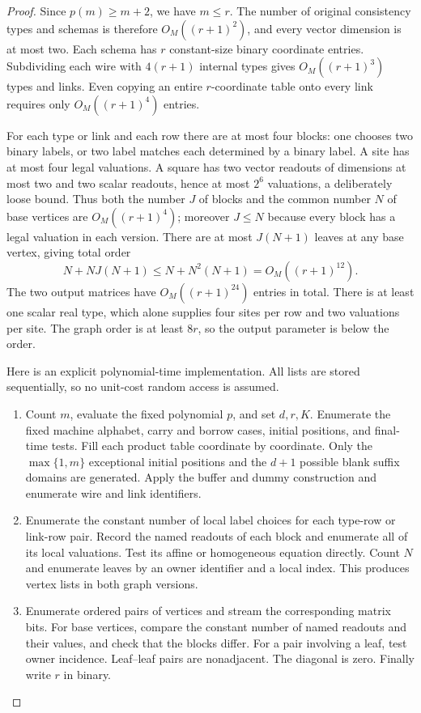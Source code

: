 \documentclass[11pt]{article}
\theoremstyle{definition}
\begin{document}
\begin{proof}
Since $p(m)\ge m+2$, we have $m\le r$. The number of original consistency
types and schemas is therefore $O_M((r+1)^2)$, and every vector dimension is
at most two. Each schema has $r$ constant-size binary coordinate entries.
Subdividing each wire with $4(r+1)$ internal types gives
$O_M((r+1)^3)$ types and links. Even copying an entire $r$-coordinate table
onto every link requires only $O_M((r+1)^4)$ entries.

For each type or link and each row there are at most four blocks: one chooses
two binary labels, or two label matches each determined by a binary label.
A site has at most four legal valuations. A square has two vector readouts
of dimensions at most two and two scalar readouts, hence at most $2^6$
valuations, a deliberately loose bound. Thus both the number $J$ of blocks
and the common number $N$ of base vertices are $O_M((r+1)^4)$; moreover
$J\le N$ because every block has a legal valuation in each version.
There are at most $J(N+1)$ leaves at any base vertex, giving total order
\begin{equation}\label{eq:graph-order-bound}
 N+NJ(N+1)\le N+N^2(N+1)=O_M((r+1)^{12}).
\end{equation}
The two output matrices have $O_M((r+1)^{24})$ entries in total.
There is at least one scalar real type, which alone supplies four sites per
row and two valuations per site. The graph order is at least $8r$, so the
output parameter is below the order.

Here is an explicit polynomial-time implementation. All lists are stored
sequentially, so no unit-cost random access is assumed.
\begin{enumerate}[label=\arabic*.,leftmargin=*]
\item Count $m$, evaluate the fixed polynomial $p$, and set $d,r,K$.
Enumerate the fixed machine alphabet, carry and borrow cases, initial
positions, and final-time tests. Fill each product table coordinate by
coordinate. Only the $\max\{1,m\}$ exceptional initial positions and the
$d+1$ possible blank suffix domains are generated. Apply the buffer and
dummy construction and enumerate wire and link identifiers.
\item Enumerate the constant number of local label choices for each
type-row or link-row pair. Record the named readouts of each block and
enumerate all of its local valuations. Test its affine or homogeneous
equation directly. Count $N$ and enumerate leaves by an owner identifier and
a local index. This produces vertex lists in both graph versions.
\item Enumerate ordered pairs of vertices and stream the corresponding
matrix bits. For base vertices, compare the constant number of named
readouts and their values, and check that the blocks differ. For a pair
involving a leaf, test owner incidence. Leaf--leaf pairs are nonadjacent.
The diagonal is zero. Finally write $r$ in binary.
\end{enumerate}


\end{proof}
\end{document}
